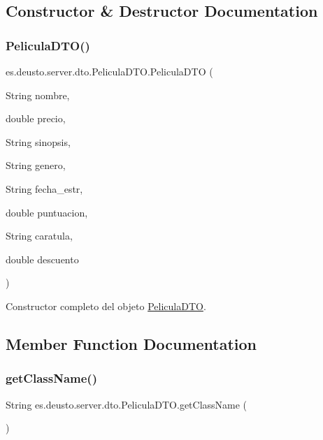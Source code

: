 \subsection{Constructor \& Destructor Documentation}
\mbox{\label{classes_1_1deusto_1_1server_1_1dto_1_1_pelicula_d_t_o_a17befc89b5876632d67c2ded3c40ae4c}} 
\subsubsection{\texorpdfstring{PeliculaDTO()}{PeliculaDTO()}}
{\footnotesize\ttfamily es.\+deusto.\+server.\+dto.\+Pelicula\+D\+T\+O.\+Pelicula\+D\+TO (\begin{DoxyParamCaption}\item[{String}]{nombre,  }\item[{double}]{precio,  }\item[{String}]{sinopsis,  }\item[{String}]{genero,  }\item[{String}]{fecha\+\_\+estr,  }\item[{double}]{puntuacion,  }\item[{String}]{caratula,  }\item[{double}]{descuento }\end{DoxyParamCaption})}

Constructor completo del objeto \mbox{\hyperlink{classes_1_1deusto_1_1server_1_1dto_1_1_pelicula_d_t_o}{Pelicula\+D\+TO}}. 

\subsection{Member Function Documentation}
\mbox{\label{classes_1_1deusto_1_1server_1_1dto_1_1_pelicula_d_t_o_a35b279538dad8e659a21d98a0e0b4c30}} 
\subsubsection{\texorpdfstring{getClassName()}{getClassName()}}
{\footnotesize\ttfamily String es.\+deusto.\+server.\+dto.\+Pelicula\+D\+T\+O.\+get\+Class\+Name (\begin{DoxyParamCaption}{ }\end{DoxyParamCaption})}

